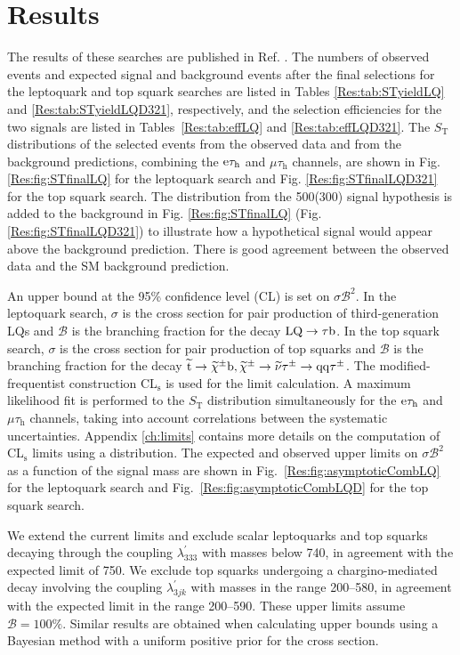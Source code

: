 \documentclass[12pt]{thesis}  %
\newcommand{\tauh}{\ensuremath{\tau_{\text{h}}}\xspace}
\newcommand{\Pe}{\ensuremath{\cmsSymbolFace{e}}\xspace}
\newcommand{\mutau}{\ensuremath{\mu\tauh}\xspace}
\newcommand{\etau}{\ensuremath{\Pe\tauh}\xspace}
\def\ST{\ensuremath{S_{\text{T}}}\xspace}
\begin{document}
\section{Results
\label{sec:results}}

The results of these searches are published in Ref. \cite{CMS-EXO-12-032-PLB}. The numbers of observed events and expected signal and background events after the final selections for the leptoquark and top squark searches are listed in Tables \ref{Res:tab:STyieldLQ} and \ref{Res:tab:STyieldLQD321}, respectively, and the selection efficiencies for the two signals are listed in Tables~\ref{Res:tab:effLQ} and \ref{Res:tab:effLQD321}. The \ST distributions of the selected events from the observed data and from the background predictions, combining the \etau and \mutau channels, are shown in Fig. \ref{Res:fig:STfinalLQ} for the leptoquark search and Fig. \ref{Res:fig:STfinalLQD321} for the top squark search. The distribution from the 500\GeV (300\GeV) signal hypothesis is added to the background in Fig. \ref{Res:fig:STfinalLQ} (Fig. \ref{Res:fig:STfinalLQD321}) to illustrate how a hypothetical signal would appear above the background prediction. There is good agreement between the observed data and the SM background prediction.

An upper bound at the 95\% confidence level (CL) is set on $\sigma \mathcal{B}^2$. In the leptoquark search, $\sigma$ is the cross section for pair production of third-generation LQs and $\mathcal{B}$ is the branching fraction for the decay $\text{LQ} \rightarrow \tau \mathrm{b}$. In the top squark search, $\sigma$ is the cross section for pair production of top squarks and $\mathcal{B}$ is the branching fraction for the decay $\widetilde{\mathrm{t}} \rightarrow \widetilde{\chi}^{\pm}\mathrm{b}, \widetilde{\chi}^{\pm} \rightarrow \widetilde{\nu}\tau^{\pm} \rightarrow \mathrm{q}\mathrm{q}\tau^{\pm}$. The modified-frequentist construction CL$_\mathrm{s}$ \cite{Read:presentation,Junk,LHC-HCG} is used for the limit calculation. A maximum likelihood fit is performed to the \ST distribution simultaneously for the \etau and \mutau channels, taking into account correlations between the systematic uncertainties. Appendix \ref{ch:limits} contains more details on the computation of CL$_\mathrm{s}$ limits using a distribution. The expected and observed upper limits on $\sigma \mathcal{B}^2$ as a function of the signal mass are shown in Fig.~\ref{Res:fig:asymptoticCombLQ} for the leptoquark search and Fig.~\ref{Res:fig:asymptoticCombLQD} for the top squark search.

We extend the current limits and exclude scalar leptoquarks and top squarks decaying through the coupling $\lambda^{\prime}_{333}$ with masses below 740\GeV, in agreement with the expected limit of 750\GeV. We exclude top squarks undergoing a chargino-mediated decay involving the coupling $\lambda^{\prime}_{3jk}$ with masses in the range 200--580\GeV, in agreement with the expected limit in the range 200--590\GeV. These upper limits assume $\mathcal{B}=100\%$. Similar results are obtained when calculating upper bounds using a
Bayesian method with a uniform positive prior for the cross section.
\end{document}
